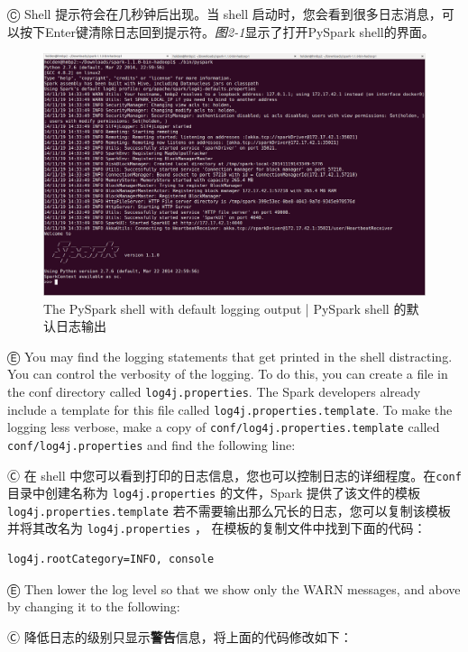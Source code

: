 Ⓒ Shell 提示符会在几秒钟后出现。当 shell 启动时，您会看到很多日志消息，可以按下Enter键清除日志回到提示符。\emph{图2-1}显示了打开PySpark
shell的界面。

\begin{figure}[htbp]
\centering
\includegraphics[width=.99\textwidth]{../images/fig_2-1.png}
\caption{The PySpark shell with default logging output  |  PySpark shell 的默认日志输出}
\end{figure}

Ⓔ \textcolor{etc}{You may find the logging statements that get printed in the shell distracting. You can control the verbosity of the logging. To do this, you can create a file in the conf directory called \lstinline{log4j.properties}. The Spark developers already include a template for this file called \lstinline{log4j.properties.template}. To make the logging less verbose, make a copy of \lstinline{conf/log4j.properties.template} called \lstinline{conf/log4j.properties} and find the following line:}

Ⓒ 在 shell 中您可以看到打印的日志信息，您也可以控制日志的详细程度。在\lstinline{conf}目录中创建名称为 \lstinline{log4j.properties} 的文件，Spark 提供了该文件的模板\lstinline{log4j.properties.template} 若不需要输出那么冗长的日志，您可以复制该模板并将其改名为 \lstinline{log4j.properties} ， 在模板的复制文件中找到下面的代码：

\begin{lstlisting}
log4j.rootCategory=INFO, console
\end{lstlisting}

Ⓔ \textcolor{etc}{Then lower the log level so that we show only the WARN messages, and above by changing it to the following: }

Ⓒ 降低日志的级别只显示\textbf{警告}信息，将上面的代码修改如下：

